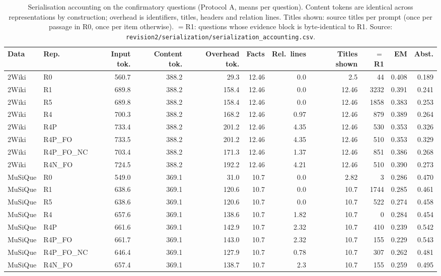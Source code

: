 \begin{table}[t]
\centering
\footnotesize
\begin{adjustbox}{max width=\linewidth}
\begin{tabular}{@{}llrrrrrrrrr@{}}
\toprule
Data & Rep. & Input tok. & Content tok. & Overhead tok. & Facts & Rel.\ lines & Titles shown & $=$R1 & EM & Abst. \\
\midrule
2Wiki & R0 & 560.7 & 388.2 & 29.3 & 12.46 & 0.0 & 2.5 & 44 & 0.408 & 0.189 \\
2Wiki & R1 & 689.8 & 388.2 & 158.4 & 12.46 & 0.0 & 12.46 & 3232 & 0.391 & 0.241 \\
2Wiki & R5 & 689.8 & 388.2 & 158.4 & 12.46 & 0.0 & 12.46 & 1858 & 0.383 & 0.253 \\
2Wiki & R4 & 700.3 & 388.2 & 168.2 & 12.46 & 0.97 & 12.46 & 879 & 0.389 & 0.264 \\
2Wiki & R4P & 733.4 & 388.2 & 201.2 & 12.46 & 4.35 & 12.46 & 530 & 0.353 & 0.326 \\
2Wiki & R4P\_FO & 733.5 & 388.2 & 201.2 & 12.46 & 4.35 & 12.46 & 510 & 0.353 & 0.329 \\
2Wiki & R4P\_FO\_NC & 703.4 & 388.2 & 171.3 & 12.46 & 1.37 & 12.46 & 851 & 0.386 & 0.268 \\
2Wiki & R4N\_FO & 724.5 & 388.2 & 192.2 & 12.46 & 4.21 & 12.46 & 510 & 0.390 & 0.273 \\
\midrule
MuSiQue & R0 & 549.0 & 369.1 & 31.0 & 10.7 & 0.0 & 2.82 & 3 & 0.286 & 0.470 \\
MuSiQue & R1 & 638.6 & 369.1 & 120.6 & 10.7 & 0.0 & 10.7 & 1744 & 0.285 & 0.461 \\
MuSiQue & R5 & 638.6 & 369.1 & 120.6 & 10.7 & 0.0 & 10.7 & 522 & 0.274 & 0.458 \\
MuSiQue & R4 & 657.6 & 369.1 & 138.6 & 10.7 & 1.82 & 10.7 & 0 & 0.284 & 0.454 \\
MuSiQue & R4P & 661.6 & 369.1 & 142.9 & 10.7 & 2.32 & 10.7 & 410 & 0.239 & 0.542 \\
MuSiQue & R4P\_FO & 661.7 & 369.1 & 143.0 & 10.7 & 2.32 & 10.7 & 155 & 0.229 & 0.543 \\
MuSiQue & R4P\_FO\_NC & 646.4 & 369.1 & 127.9 & 10.7 & 0.78 & 10.7 & 307 & 0.262 & 0.481 \\
MuSiQue & R4N\_FO & 657.4 & 369.1 & 138.7 & 10.7 & 2.3 & 10.7 & 155 & 0.259 & 0.495 \\
\bottomrule
\end{tabular}
\end{adjustbox}
\caption{Serialisation accounting on the confirmatory questions (Protocol A, means per question). Content tokens are identical across representations by construction; overhead is identifiers, titles, headers and relation lines. Titles shown: source titles per prompt (once per passage in R0, once per item otherwise). $=$R1: questions whose evidence block is byte-identical to R1. Source: \texttt{revision2/\allowbreak serialization/\allowbreak serialization\_accounting.csv}.}
\label{tab:serialisation}
\end{table}
